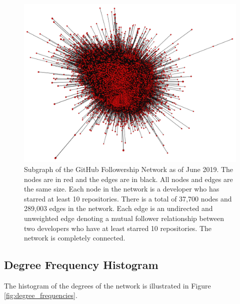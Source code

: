 \documentclass[9pt,twocolumn,twoside]{pnas-new}
\begin{document}
\begin{figure}
\centering
\includegraphics[width=.8\linewidth]{network_visualization}
\caption{Subgraph of the GitHub Followership Network as of June 2019. The nodes are in red and the edges are in black. All nodes and edges are the same size. Each node in the network is a developer who has starred at least 10 repositories. There is a total of 37,700 nodes and 289,003 edges in the network. Each edge is an undirected and unweighted edge denoting a mutual follower relationship between two developers who have at least starred 10 repositories. The network is completely connected.
}
\label{fig:network_visualization}
\end{figure}

\subsection*{Degree Frequency Histogram} The histogram of the degrees of the network is illustrated in Figure \ref{fig:degree_frequencies}.
\end{document}

